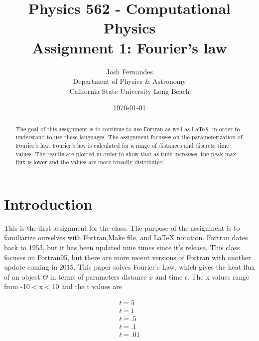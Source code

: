\documentclass[12pt]{article}
\begin{document}




\title{Physics 562 - Computational Physics\\[.5cm]
Assignment 1: Fourier's law}
\author{Josh Fernandes\\
Department of Physics \& Astronomy\\
California State University Long Beach}
\date{\today}

  
\maketitle



\begin{abstract}
The goal of this assignment is to continue to use Fortran as well as \LaTeX\, in order to understand to use these languages. The assignment focusses on the parameterization of Fourier's law. Fourier's law is calculated for a range of distances and discrete time values. The results are plotted in order to show that as time increases, the peak max flux is lower and the values are more broadly distributed. 
\end{abstract}

\section{Introduction}\label{s:intro}

This is the first assignment for the class. The purpose of the assignment is to familiarize ourselves with Fortran,Make file, and LaTeX notation. Fortran dates back to 1953, but it has been updated nine times since it's release. This class focuses on Fortran95, but there are more recent versions of Fortran with another update coming in 2015. This paper solves Fourier's Law, which gives the heat flux of an object $\Theta$ in terms of parameters distance $x$ and time $t$. The x values range from -10$<$x$<$10 and the t values are

\begin{align*}
t = 5 \\
t = 1 \\
t = .5 \\
t = .1 \\
t = .01
\end{align*}
\end{document}
